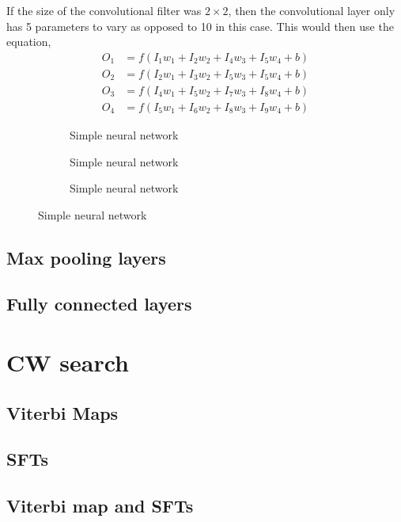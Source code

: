 If the size of the convolutional filter was $2\times 2$, then the convolutional layer only has 5 parameters to vary as opposed to 10 in this case.
This would then use the equation,
\begin{equation}
\begin{split}
    O_1 &= f\left(I_1 w_1 + I_2 w_2 + I_4 w_3 + I_5 w_4 + b\right) \\
    O_2 &=  f\left( I_2 w_1 + I_3 w_2 + I_5 w_3 + I_5 w_4 + b\right)\\
    O_3 &=  f\left(I_4 w_1 + I_5 w_2 + I_7 w_3 + I_8 w_4 + b\right)\\
    O_4 &=  f\left(I_5 w_1 + I_6 w_2 + I_8 w_3 + I_9 w_4 + b\right)
\end{split}
\end{equation}

\begin{figure}[h]
\begin{subfigure}
    \texttt{[image: ]}
    \caption{Simple neural network}
    \label{machine:cnn:convlayer:input}
\end{subfigure}   

\begin{subfigure}
    \texttt{[image: ]}
    \caption{Simple neural network}
    \label{machine:cnn:convlayer:nn}
\end{subfigure} 

\begin{subfigure}
    \texttt{[image: ]}
    \caption{Simple neural network}
    \label{machine:nn:convlayer:cnn}
\end{subfigure} 

\end{figure}

\subsection{Max pooling layers}

\subsection{Fully connected layers}


\section{CW search}

\subsection{Viterbi Maps}

\subsection{SFTs}

\subsection{Viterbi map and SFTs}
